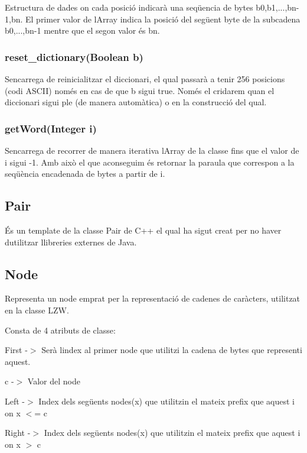 Estructura de dades on cada posició indicarà una seqüencia de bytes b0,b1,...,bn-\/1,bn. El primer valor de l\textquotesingle{}Array indica la posició del següent byte de la subcadena b0,...,bn-\/1 mentre que el segon valor és bn.

\subsubsection*{reset\+\_\+dictionary(\+Boolean b)}

S\textquotesingle{}encarrega de reinicialitzar el diccionari, el qual passarà a tenir 256 posicions (codi A\+S\+C\+II) només en cas de que b sigui true. Només el cridarem quan el diccionari sigui ple (de manera automàtica) o en la construcció del qual.

\subsubsection*{get\+Word(\+Integer i)}

S\textquotesingle{}encarrega de recorrer de manera iterativa l\textquotesingle{}Array de la classe fins que el valor de i sigui -\/1. Amb això el que aconseguim és retornar la paraula que correspon a la seqüència encadenada de bytes a partir de i.

\subsection*{Pair}

És un template de la classe Pair de C++ el qual ha sigut creat per no haver d\textquotesingle{}utilitzar llibreries externes de Java.

\subsection*{Node}

Representa un node emprat per la representació de cadenes de caràcters, utilitzat en la classe L\+ZW.

Consta de 4 atributs de classe\+:
\begin{DoxyItemize}
\item First -\/$>$ Serà l\textquotesingle{}index al primer node que utilitzi la cadena de bytes que representi aquest.
\item c -\/$>$ Valor del node
\item Left -\/$>$ Index dels següents nodes(x) que utilitzin el mateix prefix que aquest i on x $<$= c
\item Right -\/$>$ Index dels següents nodes(x) que utilitzin el mateix prefix que aquest i on x $>$ c
\end{DoxyItemize}

